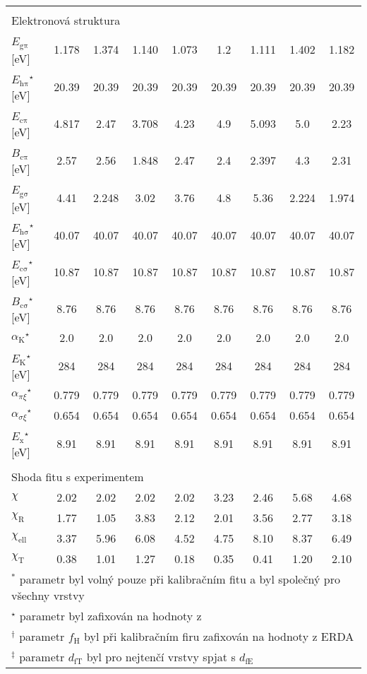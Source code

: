 \begin{tabular}{lcccccccc}
\multicolumn{9}{l}{}\\
\multicolumn{9}{l}{Elektronová struktura}\\
\hline
$E_\mathrm{g\pi}$\,[eV] & 1.178 & 1.374 & 1.140 & 1.073 & 1.2 & 1.111 & 1.402 & 1.182\\
$E_\mathrm{h\pi}$$^\star$\,[eV] & 20.39 & 20.39 & 20.39 & 20.39 & 20.39 & 20.39 & 20.39 & 20.39\\
$E_\mathrm{c\pi}$\,[eV] & 4.817 & 2.47 & 3.708 & 4.23 & 4.9 & 5.093 & 5.0 & 2.23\\
$B_\mathrm{c\pi}$\,[eV] & 2.57 & 2.56 & 1.848 & 2.47 & 2.4 & 2.397 & 4.3 & 2.31\\
$E_\mathrm{g\sigma}$\,[eV] & 4.41 & 2.248 & 3.02 & 3.76 & 4.8 & 5.36 & 2.224 & 1.974\\
$E_\mathrm{h\sigma}$$^\star$\,[eV] & 40.07 & 40.07 & 40.07 & 40.07 & 40.07 & 40.07 & 40.07 & 40.07\\
$E_\mathrm{c\sigma}$$^\star$\,[eV] & 10.87 & 10.87 & 10.87 & 10.87 & 10.87 & 10.87 & 10.87 & 10.87\\
$B_\mathrm{c\sigma}$$^\star$\,[eV] & 8.76 & 8.76 & 8.76 & 8.76 & 8.76 & 8.76 & 8.76 & 8.76\\
$\alpha_\mathrm{K}$$^\star$ & 2.0 & 2.0 & 2.0 & 2.0 & 2.0 & 2.0 & 2.0 & 2.0\\
$E_\mathrm{K}$$^\star$\,[eV] & 284 & 284 & 284 & 284 & 284 & 284 & 284 & 284\\
$\alpha_{\pi\xi}$$^\star$ & 0.779 & 0.779 & 0.779 & 0.779 & 0.779 & 0.779 & 0.779 & 0.779\\
$\alpha_{\sigma\xi}$$^\star$ & 0.654 & 0.654 & 0.654 & 0.654 & 0.654 & 0.654 & 0.654 & 0.654\\
$E_\mathrm{x}$$^\star$\,[eV] & 8.91 & 8.91 & 8.91 & 8.91 & 8.91 & 8.91 & 8.91 & 8.91\\

\multicolumn{9}{l}{}\\
\multicolumn{9}{l}{Shoda fitu s experimentem}\\
\hline
$\chi$ & 2.02 & 2.02 & 2.02 & 2.02 & 3.23 & 2.46 & 5.68 & 4.68\\
$\chi_\mathrm{R}$ & 1.77 & 1.05 & 3.83 & 2.12 & 2.01 & 3.56 & 2.77 & 3.18\\
$\chi_\mathrm{ell}$ & 3.37 & 5.96 & 6.08 & 4.52 & 4.75 & 8.10 & 8.37 & 6.49\\
$\chi_\mathrm{T}$ & 0.38 & 1.01 & 1.27 & 0.18 & 0.35 & 0.41 & 1.20 & 2.10\\


\hline
\multicolumn{9}{l}{$^\ast$ parametr byl volný pouze při kalibračním fitu a byl společný pro všechny vrstvy}\\
\multicolumn{9}{l}{$^\star$ parametr byl zafixován na hodnoty z \cite{Franta2011}}\\
\multicolumn{9}{l}{$^\dagger$ parametr $f_\mathrm{H}$ byl při kalibračním firu zafixován na hodnoty z ERDA}\\
\multicolumn{9}{l}{$^\ddagger$ parametr $d_\mathrm{fT}$ byl pro nejtenčí vrstvy spjat s $d_\mathrm{fE}$}\\

\end{tabular}
